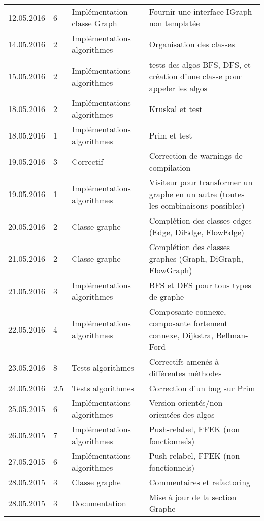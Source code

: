 \documentclass[french]{article}
\begin{document}
\begin{longtable}{p{}|p{}|p{}|p{}}
		12.05.2016 & 6 & Implémentation classe Graph & Fournir une interface IGraph non templatée \\
		14.05.2016 & 2 & Implémentations algorithmes & Organisation des classes \\
		15.05.2016 & 2 & Implémentations algorithmes & tests des algos BFS, DFS, et création d'une classe pour appeler les algos \\
		\hline
		18.05.2016 & 2 & Implémentations algorithmes & Kruskal et test\\
		18.05.2016 & 1 & Implémentations algorithmes & Prim et test\\
		19.05.2016 & 3 & Correctif & Correction de warnings de compilation\\
		19.05.2016 & 1 & Implémentations algorithmes & Visiteur pour transformer un graphe en un autre (toutes les combinaisons possibles)\\
		20.05.2016 & 2 & Classe graphe & Complétion des classes edges (Edge, DiEdge, FlowEdge)\\
		21.05.2016 & 2 & Classe graphe & Complétion des classes graphes (Graph, DiGraph, FlowGraph)\\
		21.05.2016 & 3 & Implémentations algorithmes & BFS et DFS pour tous types de graphe\\
		22.05.2016 & 4 & Implémentations algorithmes & Composante connexe, composante fortement connexe, Dijkstra, Bellman-Ford\\
		\hline
		23.05.2016 & 8 & Tests algorithmes & Correctifs amenés à différentes méthodes\\
		24.05.2016 & 2.5 & Tests algorithmes & Correction d'un bug sur Prim\\
		25.05.2015 & 6 & Implémentations algorithmes & Version orientés/non orientées des algos\\
		26.05.2015 & 7 & Implémentations algorithmes & Push-relabel, FFEK (non fonctionnels)\\
		27.05.2015 & 6 & Implémentations algorithmes & Push-relabel, FFEK (non fonctionnels)\\
		28.05.2015 & 3 & Classe graphe & Commentaires et refactoring\\
		28.05.2015 & 3 & Documentation & Mise à jour de la section Graphe\\
	\end{longtable}
	
\end{document}
